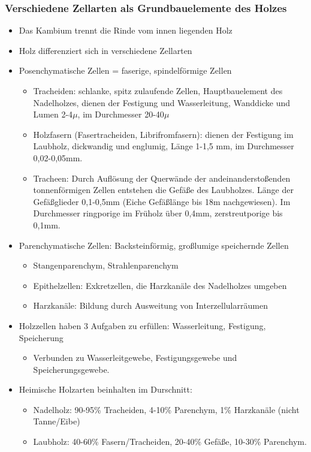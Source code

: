 \documentclass[12pt]{article}
\begin{document}
\subsubsection{Verschiedene Zellarten als Grundbauelemente des Holzes}
\begin{itemize}
  \item Das Kambium trennt die Rinde vom innen liegenden Holz 
  \item Holz differenziert sich in verschiedene Zellarten
  \item Posenchymatische Zellen = faserige, spindelförmige Zellen
  \begin{itemize}
    \item Tracheiden: schlanke, spitz zulaufende Zellen, Hauptbauelement des
          Nadelholzes, dienen der Festigung und Wasserleitung, Wanddicke und
          Lumen 2-4$\mu$, im Durchmesser 20-40$\mu$
     \item Holzfasern (Fasertracheiden, Librifromfasern): dienen der Festigung
           im Laubholz, dickwandig und englumig, Länge 1-1,5 mm, im Durchmesser
           0,02-0,05mm.
      \item Tracheen: Durch Auflösung der Querwände der andeinanderstoßenden
            tonnenförmigen Zellen entstehen die Gefäße des Laubholzes. Länge
            der Gefäßglieder 0,1-0,5mm (Eiche Gefäßlänge bis 18m
            nachgewiesen). Im Durchmesser ringporige im Früholz über 0,4mm,
            zerstreutporige bis 0,1mm.
  \end{itemize}
  \item Parenchymatische Zellen: Backsteinförmig, großlumige speichernde Zellen
  \begin{itemize}
    \item Stangenparenchym, Strahlenparenchym
    \item Epithelzellen: Exkretzellen, die Harzkanäle des Nadelholzes umgeben
    \item Harzkanäle: Bildung durch Ausweitung von Interzellularräumen
  \end {itemize}
  \item Holzzellen haben 3 Aufgaben zu erfüllen: Wasserleitung, Festigung,
        Speicherung
  \begin{itemize}
    \item Verbunden zu Wasserleitgewebe, Festigungsgewebe und Speicherungsgewebe.
  \end{itemize}
  \item Heimische Holzarten beinhalten im Durschnitt:
  \begin{itemize}
    \item Nadelholz: 90-95\% Tracheiden, 4-10\% Parenchym, 1\% Harzkanäle (nicht
    Tanne/Eibe)
    \item Laubholz: 40-60\% Fasern/Tracheiden, 20-40\% Gefäße, 10-30\%
    Parenchym.
    \end{itemize} 
\end{itemize}
  
\end{document}
